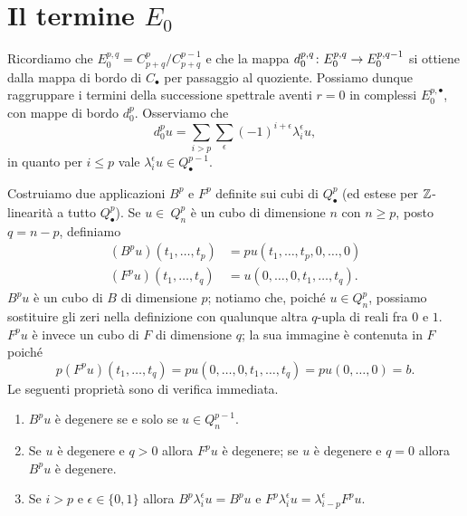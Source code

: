 \section{Il termine \texorpdfstring{\(E_0\)}{E0}}
Ricordiamo che \(E^{p,q}_0=C^p_{p+q}/C^{p-1}_{p+q}\) e che la mappa \(\map{d^{p,q}_0}{E^{p,q}_0}{E^{p,q-1}_0}\) si ottiene dalla mappa di bordo di \(C_\bullet\) per passaggio al quoziente. Possiamo dunque raggruppare i termini della successione spettrale aventi \(r=0\) in complessi \(E^{p,\bullet}_0\), con mappe di bordo \(d^p_0\). Osserviamo che
\[
d^p_0u=\sum_{i>p}\sum_\epsilon(-1)^{i+\epsilon}\lambda^\epsilon_iu,
\]
in quanto per \(i\le p\) vale \(\lambda^\epsilon_iu\in Q^{p-1}_\bullet\).


Costruiamo due applicazioni \(B^p\) e \(F^p\) definite sui cubi di \(Q^p_\bullet\) (ed estese per \(\mathbb{Z}\)-linearità a tutto \(Q^p_\bullet\)). Se \(u\in\ Q^p_n\) è un cubo di dimensione \(n\) con \(n\ge p\), posto \(q=n-p\), definiamo
\begin{align*}
(B^pu)(t_1,\ldots,t_p)&=pu(t_1,\ldots,t_p,0,\ldots,0)\\
(F^pu)(t_1,\ldots,t_q)&=u(0,\ldots,0,t_1,\ldots,t_q).
\end{align*}
\(B^pu\) è un cubo di \(B\) di dimensione \(p\); notiamo che, poiché \(u\in Q^p_n\), possiamo sostituire gli zeri nella definizione con qualunque altra \(q\)-upla di reali fra \(0\) e \(1\). \(F^pu\) è invece un cubo di \(F\) di dimensione \(q\); la sua immagine è contenuta in \(F\) poiché
\[
p(F^pu)(t_1,\ldots,t_q)=pu(0,\ldots,0,t_1,\ldots,t_q)=pu(0,\ldots,0)=b.
\]
Le seguenti proprietà sono di verifica immediata.
\begin{enumerate}
\item\label{spectral-sequence-of-fibration:pr1} \(B^pu\) è degenere se e solo se \(u\in Q^{p-1}_n\).
\item\label{spectral-sequence-of-fibration:pr2} Se \(u\) è degenere e \(q>0\) allora \(F^pu\) è degenere; se \(u\) è degenere e \(q=0\) allora \(B^pu\) è degenere.
\item\label{spectral-sequence-of-fibration:pr3} Se \(i>p\) e \(\epsilon\in\{0,1\}\) allora \(B^p\lambda^\epsilon_iu=B^pu\) e \(F^p\lambda^\epsilon_iu=\lambda^\epsilon_{i-p}F^pu\).
\end{enumerate}

